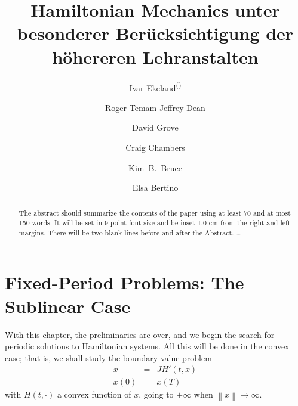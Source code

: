 \documentclass{../styles/svproc}
\begin{document}
\mainmatter              %
%
\title{Hamiltonian Mechanics unter besonderer Ber\"ucksichtigung der
h\"ohereren Lehranstalten}
%
%
\author{Ivar Ekeland\textsuperscript{(\Letter)} \and Roger Temam
Jeffrey Dean \and David Grove \and Craig Chambers \and Kim~B.~Bruce \and
Elsa Bertino}
%
%
%

\maketitle              %

\begin{abstract}
The abstract should summarize the contents of the paper
using at least 70 and at most 150 words. It will be set in 9-point
font size and be inset 1.0 cm from the right and left margins.
There will be two blank lines before and after the Abstract. \dots
\end{abstract}
%
\section{Fixed-Period Problems: The Sublinear Case}
%
With this chapter, the preliminaries are over, and we begin the search
for periodic solutions to Hamiltonian systems. All this will be done in
the convex case; that is, we shall study the boundary-value problem
\begin{eqnarray*}
  \dot{x}&=&JH' (t,x)\\
  x(0) &=& x(T)
\end{eqnarray*}
with $H(t,\cdot)$ a convex function of $x$, going to $+\infty$ when
$\left\|x\right\| \to \infty$.
\end{document}
